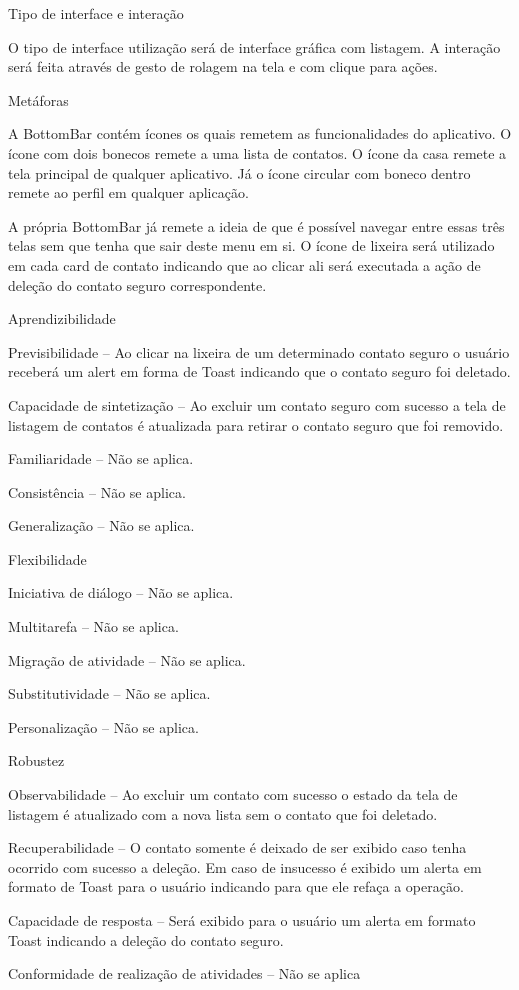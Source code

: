 \begin{alineas}
  \item Tipo de interface e interação
  
O tipo de interface utilização será de interface gráfica com listagem. A interação será feita através de gesto de rolagem na tela e com clique para ações. 
  \item Metáforas
  
A BottomBar contém ícones os quais remetem as funcionalidades do aplicativo. O ícone com dois bonecos remete a uma lista de contatos. O ícone da casa remete a tela principal de qualquer aplicativo. Já o ícone circular com boneco dentro remete ao perfil em qualquer aplicação. 

A própria BottomBar já remete a ideia de que é possível navegar entre essas três telas sem que tenha que sair deste menu em si.
O ícone de lixeira será utilizado em cada card de contato indicando que ao clicar ali será executada a ação de deleção do contato seguro correspondente.

  \item Aprendizibilidade
  
Previsibilidade – Ao clicar na lixeira de um determinado contato seguro o usuário receberá um alert em forma de Toast indicando que o contato seguro foi deletado.

Capacidade de sintetização – Ao excluir um contato seguro com sucesso a tela de listagem de contatos é atualizada para retirar o contato seguro que foi removido.

Familiaridade – Não se aplica.

Consistência – Não se aplica. 

Generalização – Não se aplica.

  \item Flexibilidade
  
Iniciativa de diálogo – Não se aplica.

Multitarefa – Não se aplica.

Migração de atividade – Não se aplica.

 Substitutividade – Não se aplica.
 
Personalização – Não se aplica.

  \item Robustez
  
Observabilidade – Ao excluir um contato com sucesso o estado da tela de listagem é atualizado com a nova lista sem o contato que foi deletado.

Recuperabilidade – O contato somente é deixado de ser exibido caso tenha ocorrido com sucesso a deleção. Em caso de insucesso é exibido um alerta em formato de Toast para o usuário indicando para que ele refaça a operação.

Capacidade de resposta – Será exibido para o usuário um alerta em formato Toast indicando a deleção do contato seguro.

Conformidade de realização de atividades – Não se aplica
\end{alineas}

